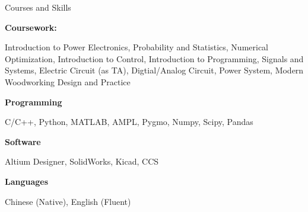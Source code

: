 \documentclass[]{ZhongtaoGuan-resume}
\begin{document}
\begin{section}{Courses and Skills}

\begin{subsectionnobullet}{\textbf{Coursework:}}{}{}{}
 \item {Introduction to Power Electronics, Probability and Statistics, Numerical Optimization, Introduction to Control, Introduction to Programming,
Signals and Systems, Electric Circuit (as TA), Digtial/Analog Circuit, Power System, Modern Woodworking Design and Practice}
\end{subsectionnobullet}
\begin{subsectionnobullet}{\textbf{Programming}}{}{}{}
    \item {C/C++, Python, MATLAB, AMPL, Pygmo, Numpy, Scipy, Pandas}
\end{subsectionnobullet}
\begin{subsectionnobullet}{\textbf{Software}}{}{}{}
    \item {Altium Designer, SolidWorks, Kicad, CCS}
\end{subsectionnobullet}
\begin{subsectionnobullet}{\textbf{Languages}}{}{}{}
    \item {Chinese (Native), English (Fluent)}
\end{subsectionnobullet}
\end{section}
\end{document}
